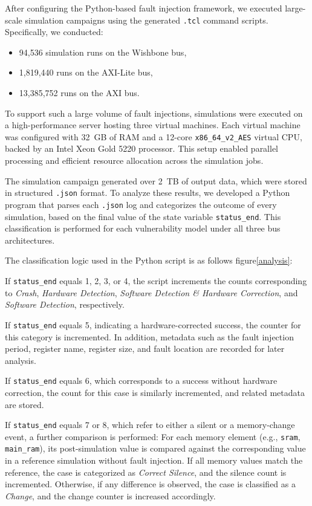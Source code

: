After configuring the Python-based fault injection framework, we executed large-scale simulation campaigns using the generated \texttt{.tcl} command scripts. Specifically, we conducted: 
\begin{itemize}
    \item 94,536 simulation runs on the Wishbone bus,
    \item 1,819,440 runs on the AXI-Lite bus,
    \item 13,385,752 runs on the AXI bus.
\end{itemize}

To support such a large volume of fault injections, simulations were executed on a high-performance server hosting three virtual machines. Each virtual machine was configured with 32~GB of RAM and a 12-core \texttt{x86\_64\_v2\_AES} virtual CPU, backed by an Intel Xeon Gold 5220 processor. This setup enabled parallel processing and efficient resource allocation across the simulation jobs.

The simulation campaign generated over 2~TB of output data, which were stored in structured \texttt{.json} format. To analyze these results, we developed a Python program that parses each \texttt{.json} log and categorizes the outcome of every simulation, based on the final value of the state variable \texttt{status\_end}. This classification is performed for each vulnerability model under all three bus architectures.

The classification logic used in the Python script is as follows figure\ref{analysis}:

If \texttt{status\_end} equals 1, 2, 3, or 4, the script increments the counts corresponding to \textit{Crash}, \textit{Hardware Detection}, \textit{Software Detection \& Hardware Correction}, and \textit{Software Detection}, respectively.

If \texttt{status\_end} equals 5, indicating a hardware-corrected success, the counter for this category is incremented. In addition, metadata such as the fault injection period, register name, register size, and fault location are recorded for later analysis.

If \texttt{status\_end} equals 6, which corresponds to a success without hardware correction, the count for this case is similarly incremented, and related metadata are stored.

If \texttt{status\_end} equals 7 or 8, which refer to either a silent or a memory-change event, a further comparison is performed: For each memory element (e.g., \texttt{sram}, \texttt{main\_ram}), its post-simulation value is compared against the corresponding value in a reference simulation without fault injection. If all memory values match the reference, the case is categorized as \textit{Correct Silence}, and the silence count is incremented. Otherwise, if any difference is observed, the case is classified as a \textit{Change}, and the change counter is increased accordingly.

